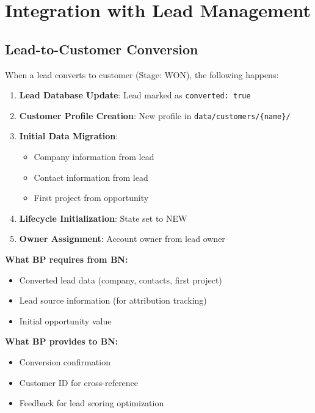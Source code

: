 \section{Integration with Lead Management}
\label{sec:bp-integration}

\subsection{Lead-to-Customer Conversion}

When a lead converts to customer (Stage: WON), the following happens:

\begin{enumerate}
\item \textbf{Lead Database Update}: Lead marked as \texttt{converted: true}
\item \textbf{Customer Profile Creation}: New profile in \texttt{data/customers/\{name\}/}
\item \textbf{Initial Data Migration}:
    \begin{itemize}
    \item Company information from lead
    \item Contact information from lead
    \item First project from opportunity
    \end{itemize}
\item \textbf{Lifecycle Initialization}: State set to NEW
\item \textbf{Owner Assignment}: Account owner from lead owner
\end{enumerate}

\begin{tcolorbox}[colback=yellow!5!white, colframe=yellow!75!black,
    title=Integration: Appendix BP $\leftrightarrow$ Appendix UNMAPPED_BN (Lead Management)]
\textbf{What BP requires from BN:}
\begin{itemize}[nosep]
\item Converted lead data (company, contacts, first project)
\item Lead source information (for attribution tracking)
\item Initial opportunity value
\end{itemize}

\textbf{What BP provides to BN:}
\begin{itemize}[nosep]
\item Conversion confirmation
\item Customer ID for cross-reference
\item Feedback for lead scoring optimization
\end{itemize}
\end{tcolorbox}


